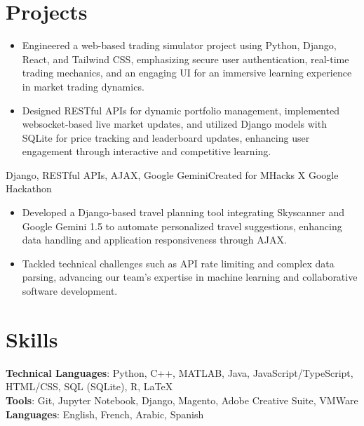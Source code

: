 \documentclass[letterpaper,10.5pt]{article}
\begin{document}
\section{Projects}
\begin{itemize}
    \item Engineered a web-based trading simulator project using Python, Django, React, and Tailwind CSS, emphasizing secure user authentication, real-time trading mechanics, and an engaging UI for an immersive learning experience in market trading dynamics.
    
    \item Designed RESTful APIs for dynamic portfolio management, implemented websocket-based live market updates, and utilized Django models with SQLite for price tracking and leaderboard updates, enhancing user engagement through interactive and competitive learning.
\end{itemize}
{Django, RESTful APIs, AJAX, Google Gemini}{Created for MHacks X Google Hackathon}
\begin{itemize}
    \item Developed a Django-based travel planning tool integrating Skyscanner and Google Gemini 1.5 to automate personalized travel suggestions, enhancing data handling and application responsiveness through AJAX.
    \item Tackled technical challenges such as API rate limiting and complex data parsing, advancing our team's expertise in machine learning and collaborative software development.
\end{itemize}
\section{Skills}
\textbf{Technical Languages}: Python, C++, MATLAB, Java, JavaScript/TypeScript, HTML/CSS,
SQL (SQLite), R, \LaTeX \\
\textbf{Tools}: Git, Jupyter Notebook, Django, Magento, Adobe Creative Suite, VMWare \\
\textbf{Languages}: English, French, Arabic, Spanish
\end{document}
